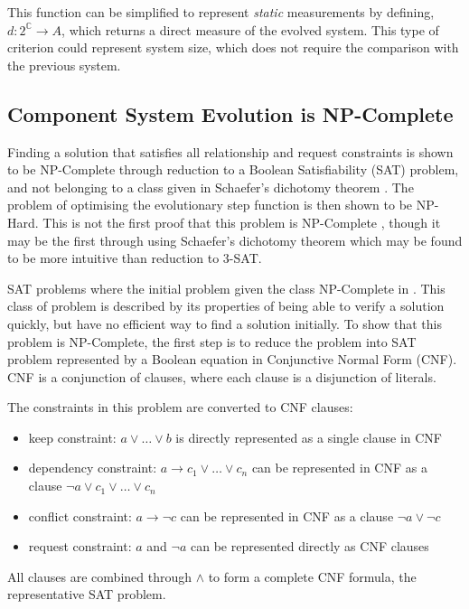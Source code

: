 This function can be simplified to represent \textit{static} measurements by defining, $d: 2^\mathbb{C} \rightarrow A$, which returns a direct measure of the evolved system.
This type of criterion could represent system size, which does not require the comparison with the previous system.

\subsection{Component System Evolution is NP-Complete}
Finding a solution that satisfies all relationship and request constraints is shown to be NP-Complete through reduction to a Boolean Satisfiability (SAT) problem,
and not belonging to a class given in Schaefer's dichotomy theorem \cite{Schaefer1978}.
The problem of optimising the evolutionary step function is then shown to be NP-Hard.
This is not the first proof that this problem is NP-Complete \cite{edos2005report}, 
though it may be the first through using Schaefer's dichotomy theorem which may be found to be more intuitive than reduction to 3-SAT.

SAT problems where the initial problem given the class NP-Complete in \cite{cook1971}.
This class of problem is described by its properties of being able to verify a solution quickly, but have no efficient way to find a solution initially.
To show that this problem is NP-Complete, the first step is to reduce the problem into SAT problem represented by a Boolean equation in Conjunctive Normal Form (CNF).
CNF is a conjunction of clauses, where each clause is a disjunction of literals.

The constraints in this problem are converted to CNF clauses:
\begin{itemize}
  \item keep constraint: $a \vee \ldots \vee b$ is directly represented as a single clause in CNF
  \item dependency constraint: $a \rightarrow c_1 \vee \ldots \vee c_n$ can be represented in CNF as a clause $\neg a \vee c_1 \vee \ldots \vee c_n$
  \item conflict constraint: $a \rightarrow \neg c$ can be represented in CNF as a clause $\neg a \vee \neg c$
  \item request constraint: $a$ and $\neg a$ can be represented directly as CNF clauses
\end{itemize}
All clauses are combined through $\wedge$ to form a complete CNF formula, the representative SAT problem.

